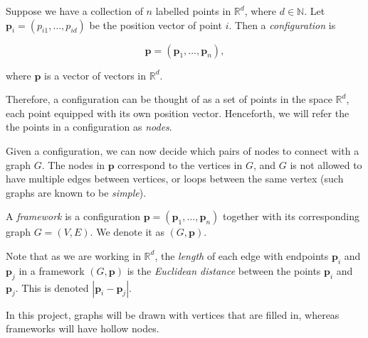 \begin{definition}
    Suppose we have a collection of $n$ labelled points in $\mathbb{R}^d$, where $d \in \mathbb{N}$. Let $\mathbf{p}_i = (p_{i1}, \hdots, p_{id})$ be the position vector of point $i$. Then a \textit{configuration} is

\[
\mathbf{p} = (\mathbf{p}_1, \hdots, \mathbf{p}_n),
\]

\begin{flushleft}
where $\mathbf{p}$ is a vector of vectors in $\mathbb{R}^d$.     
\end{flushleft}
\end{definition}

\begin{flushleft}
Therefore, a configuration can be thought of as a set of points in the space $\mathbb{R}^d$, each point equipped with its own position vector. Henceforth, we will refer the the points in a configuration as \textit{nodes}. 
\end{flushleft}

\begin{flushleft}
Given a configuration, we can now decide which pairs of nodes to connect with a graph $G$. The nodes in $\mathbf{p}$ correspond to the vertices in $G$, and $G$ is not allowed to have multiple edges between vertices, or loops between the same vertex (such graphs are known to be \textit{simple}).
\end{flushleft}

\begin{definition}
    A \textit{framework} is a configuration $\mathbf{p} = (\mathbf{p}_1, \hdots, \mathbf{p}_n)$ together with its corresponding graph $G = (V,E)$. We denote it as $(G,\mathbf{p})$.
\end{definition}

\begin{flushleft}
Note that as we are working in $\mathbb{R}^d$, the \textit{length} of each edge with endpoints $\mathbf{p}_i$ and $\mathbf{p}_j$ in a framework $(G,\mathbf{p})$ is the \textit{Euclidean distance} between the points $\mathbf{p}_i$ and $\mathbf{p}_j$. This is denoted $|\mathbf{p}_i - \mathbf{p}_j|$.

In this project, graphs will be drawn with vertices that are filled in, whereas frameworks will have hollow nodes. 
\end{flushleft}


